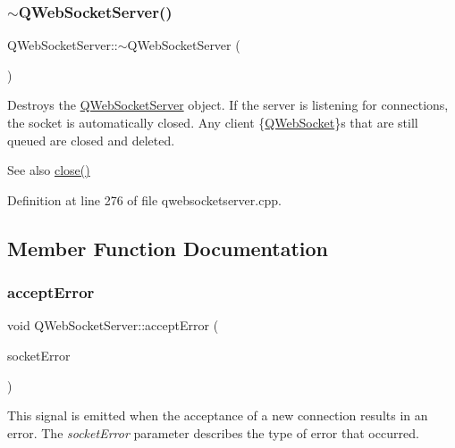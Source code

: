 \subsubsection{\texorpdfstring{$\sim$\+Q\+Web\+Socket\+Server()}{~QWebSocketServer()}}
{\footnotesize\ttfamily Q\+Web\+Socket\+Server\+::$\sim$\+Q\+Web\+Socket\+Server (\begin{DoxyParamCaption}{ }\end{DoxyParamCaption})\hspace{0.3cm}{\ttfamily [virtual]}}

Destroys the \mbox{\hyperlink{class_q_web_socket_server}{Q\+Web\+Socket\+Server}} object. If the server is listening for connections, the socket is automatically closed. Any client \{\mbox{\hyperlink{class_q_web_socket}{Q\+Web\+Socket}}\}s that are still queued are closed and deleted.

\begin{DoxySeeAlso}{See also}
\mbox{\hyperlink{class_q_web_socket_server_aa4b5f9244c27cdd1b0c8ee830ac0c1e1}{close()}} 
\end{DoxySeeAlso}


Definition at line 276 of file qwebsocketserver.\+cpp.



\subsection{Member Function Documentation}
\mbox{\label{class_q_web_socket_server_a660076e922f44bad48b57b7926593060}} 
\subsubsection{\texorpdfstring{accept\+Error}{acceptError}}
{\footnotesize\ttfamily void Q\+Web\+Socket\+Server\+::accept\+Error (\begin{DoxyParamCaption}\item[{Q\+Abstract\+Socket\+::\+Socket\+Error}]{socket\+Error }\end{DoxyParamCaption})\hspace{0.3cm}{\ttfamily [signal]}}

This signal is emitted when the acceptance of a new connection results in an error. The {\itshape socket\+Error} parameter describes the type of error that occurred.

